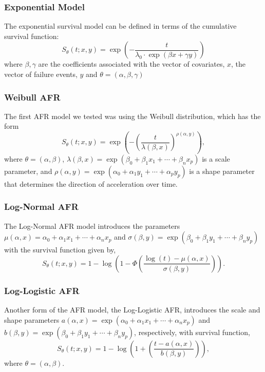 \subsubsection{Exponential Model}
The exponential survival model can be defined in terms of the cumulative survival function:
$$
S_{\theta}(t; x, y) = \exp \left( -\frac{t}{\lambda_0 \cdot \exp(\beta x + \gamma y)} \right)
$$
where $\beta, \gamma$ are the coefficients associated with the vector of covariates, $x$, the vector of failure events, $y$ and $\theta = (\alpha, \beta, \gamma)$

\subsubsection{Weibull AFR}
The first AFR model we tested was using the Weibull distribution, which has the form
\[
	S_\theta(t; x, y) = \exp{\left( - \left( \frac{t}{\lambda(\beta, x)} \right)^{\rho(\alpha, y)} \right)},
\]
where $\theta=(\alpha, \beta)$, $\lambda(\beta, x)=\exp(\beta_0 + \beta_1 x_1 + \cdots + \beta_n x_p)$ is a scale parameter, and $\rho(\alpha, y)=\exp(\alpha_0 + \alpha_1 y_1 + \cdots + \alpha_p y_p)$ is a shape parameter that determines the direction of acceleration over time.

\subsubsection{Log-Normal AFR}

The Log-Normal AFR model introduces the parameters $\mu(\alpha, x) = \alpha_0 + \alpha_1 x_1 + \cdots + \alpha_n x_p $ and $\sigma(\beta, y) = \exp(\beta_0 + \beta_1 y_1 + \cdots + \beta_n y_p)$ with the survival function given by,
\[
	S_\theta(t; x, y) = 1 - \log \left( 1 - \Phi \left (  \frac{\log(t) - \mu(\alpha, x) }{ \sigma(\beta, y) } \right) \right).
\]



\subsubsection{Log-Logistic AFR}

Another form of the AFR model, the Log-Logistic AFR, introduces the scale and shape parameters $a(\alpha, x) = \exp(\alpha_0 + \alpha_1 x_1 + \cdots + \alpha_n x_p )$ and $b(\beta, y) = \exp(\beta_0 + \beta_1 y_1 + \cdots + \beta_n y_p)$, respectively, with survival function,
\[
	S_\theta(t; x, y) = 1 - \log \left( 1 + \left (  \frac{t - a(\alpha, x) }{ b(\beta, y) }\right)\right),
\]
where $\theta = (\alpha, \beta)$.



